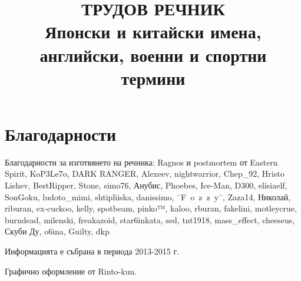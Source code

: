 \documentclass[12pt, oneside]{report}
\author{}
\title{ТРУДОВ РЕЧНИК\\
\large{Японски и китайски имена, английски, военни и спортни термини}}
\begin{document}
\maketitle

\selectbglanguage

\section*{Благодарности}
    
Благодарности за изготвянето на речника: Ragnos и postmortem от Eastern Spirit, KoP3Le7o, DARK RANGER, Alexeev, nightwarrior, Chep\_92, Hristo Lishev, BestRipper, Stone, simo76, Анубис, Phoebes, Ice-Man, D300, elisiaelf, SonGoku, ludoto\_mimi, shtipliiska, danissimo, \-\=\ F\ o\ z\ z\ y\ \=\-, Zaza14, Николай, riburan, ex-cuckoo, kelly, spotbeam, pinko™, kaloo, rburan, fakelini, motleycrue, burndead, milenski, freakazoid, star6inkata, sed, tnt1918, mass\_effect, cheeseus, Скуби Ду, o6ina, Guilty, dkp

\quad

Информацията е събрана в периода 2013-2015 г.

\quad

Графично оформление от Rinto-kun.

\tableofcontents

\listoftables









 
\end{document}
